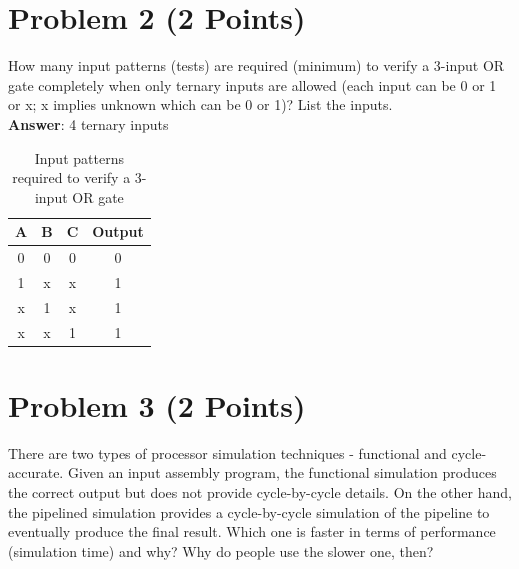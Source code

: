 \documentclass[11pt,letterpaper]{article}
\begin{document}
	
	\section*{Problem 2 (2 Points)}
	
	How many input patterns (tests) are required (minimum) to verify a 3-input OR gate completely when only ternary inputs are allowed (each input can be 0 or 1 or x;  x implies unknown which can be 0 or 1)? List the inputs.\\
	
	\textbf{\Large Answer}: 4 ternary inputs
	
	\begin{table}[H]
		\centering
		\begin{tabular}{|c |c | c | c|}
			\hline
			A & B & C & Output\\\hline
			0 & 0 & 0 & 0 \\\hline
			1 & x & x & 1 \\\hline
			x & 1 & x & 1 \\\hline
			x & x & 1 & 1 \\\hline\hline		
		\end{tabular}
	\caption{Input patterns required to verify a 3-input OR gate}
	\end{table}
	
	
	\section*{Problem 3 (2 Points)}
	
	There are two types of processor simulation techniques - functional and cycle-accurate. Given an input assembly program, the functional simulation produces the correct output but does not provide cycle-by-cycle  details. On  the  other  hand,  the  pipelined  simulation  provides  a cycle-by-cycle  simulation  of  the pipeline  to  eventually  produce  the  final  result. Which one  is  faster  in  terms  of  performance  (simulation time) and why? Why do people use the slower one, then?\\
	
\end{document}
